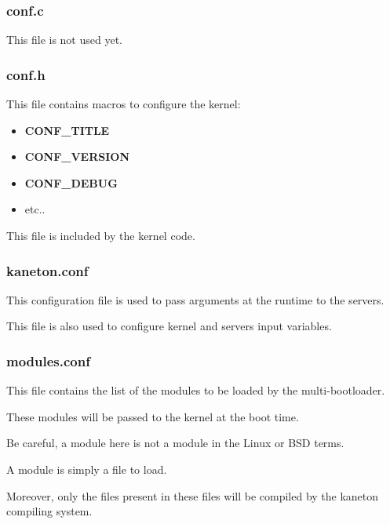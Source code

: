
\begin{frame}
  \frametitle{conf.c}

  This file is not used yet.
\end{frame}


\begin{frame}
  \frametitle{conf.h}

  This file contains macros to configure the kernel:

  \begin{itemize}
    \item
      \textbf{CONF\_TITLE}
    \item
      \textbf{CONF\_VERSION}
    \item
      \textbf{CONF\_DEBUG}
    \item
      etc..
  \end{itemize}

  \nl

  This file is included by the kernel code.
\end{frame}


\begin{frame}
  \frametitle{kaneton.conf}

  This configuration file is used to pass arguments at the runtime to the
  servers.

  \nl

  This file is also used to configure kernel and servers input variables.
\end{frame}


\begin{frame}
  \frametitle{modules.conf}

  This file contains the list of the modules to be loaded by the
  multi-bootloader.

  \nl

  These modules will be passed to the kernel at the boot time.

  \nl

  Be careful, a module here is not a module in the Linux or BSD terms.

  \nl

  A module is simply a file to load.

  \nl

  Moreover, only the files present in these files will be compiled by
  the kaneton compiling system.
\end{frame}

